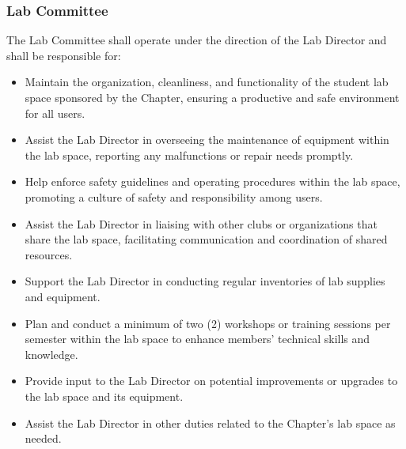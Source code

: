 \documentclass[10pt, oneside]{article}
\begin{document}
\subsubsection{Lab Committee}
The Lab Committee shall operate under the direction of the Lab Director and shall be responsible for:
\begin{itemize}
    \item Maintain the organization, cleanliness, and functionality of the student lab space sponsored by the Chapter, ensuring a productive and safe environment for all users.
    \item Assist the Lab Director in overseeing the maintenance of equipment within the lab space, reporting any malfunctions or repair needs promptly.
    \item Help enforce safety guidelines and operating procedures within the lab space, promoting a culture of safety and responsibility among users.
    \item Assist the Lab Director in liaising with other clubs or organizations that share the lab space, facilitating communication and coordination of shared resources.
    \item Support the Lab Director in conducting regular inventories of lab supplies and equipment.
    \item Plan and conduct a minimum of two (2) workshops or training sessions per semester within the lab space to enhance members' technical skills and knowledge.
    \item Provide input to the Lab Director on potential improvements or upgrades to the lab space and its equipment.
    \item Assist the Lab Director in other duties related to the Chapter's lab space as needed.
\end{itemize}
\end{document}
